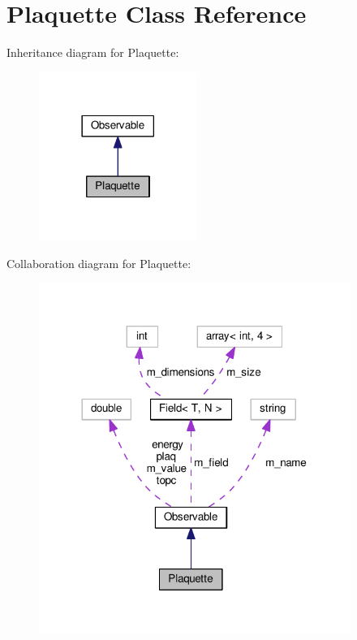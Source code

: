 \hypertarget{classPlaquette}{}\section{Plaquette Class Reference}
\label{classPlaquette}


Inheritance diagram for Plaquette\+:
\nopagebreak
\begin{figure}[H]
\begin{center}
\leavevmode
\includegraphics[width=146pt]{classPlaquette__inherit__graph}
\end{center}
\end{figure}


Collaboration diagram for Plaquette\+:
\nopagebreak
\begin{figure}[H]
\begin{center}
\leavevmode
\includegraphics[width=288pt]{classPlaquette__coll__graph}
\end{center}
\end{figure}

